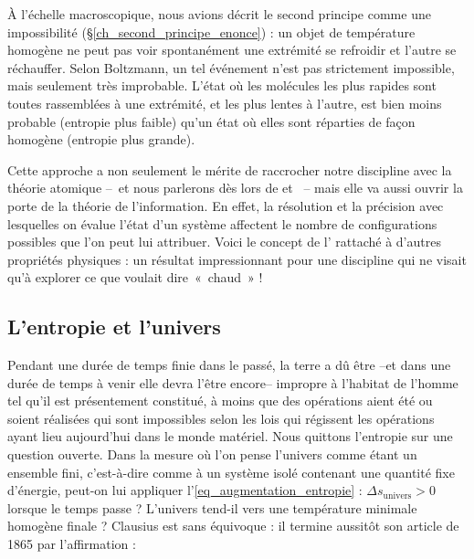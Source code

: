 		À l’échelle macroscopique, nous avions décrit le second principe comme une impossibilité (\S\ref{ch_second_principe_enonce}) : un objet de température homogène ne peut pas voir spontanément une extrémité se refroidir et l’autre se réchauffer. Selon Boltzmann, un tel événement n’est pas strictement impossible, mais seulement très improbable. L’état où les molécules les plus rapides sont toutes rassemblées à une extrémité, et les plus lentes à l’autre, est bien moins probable (entropie plus faible) qu’un état où elles sont réparties de façon homogène (entropie plus grande).
		
		Cette approche a non seulement le mérite de raccrocher notre discipline avec la théorie atomique --\ et nous parlerons dès lors de  et \ -- mais elle va aussi ouvrir la porte de la théorie de l’information. En effet, la résolution et la précision avec lesquelles on évalue l’état d’un système affectent le nombre de configurations possibles que l’on peut lui attribuer. Voici le concept de l’ rattaché à d’autres propriétés physiques : un résultat impressionnant pour une discipline qui ne visait qu’à explorer ce que voulait dire~«~chaud~» !
		
	\subsection{L’entropie et l’univers}
	
			Pendant une durée de temps finie dans le passé, la terre a dû être --et dans une durée de temps à venir elle devra l’être encore-- impropre à l’habitat de l’homme tel qu’il est présentement constitué, à moins que des opérations aient été ou soient réalisées qui sont impossibles selon les lois qui régissent les opérations ayant lieu aujourd’hui dans le monde matériel.
		Nous quittons l’entropie sur une question ouverte. Dans la mesure où l’on pense l’univers comme étant un ensemble fini, c’est-à-dire comme à un système isolé contenant une quantité fixe d’énergie, peut-on lui appliquer l’\cref{eq_augmentation_entropie} : $\Delta s_\text{univers} > 0$ lorsque le temps passe ? L’univers tend-il vers une température minimale homogène finale ? Clausius est sans équivoque : il termine aussitôt son article de 1865 par l’affirmation :
			
